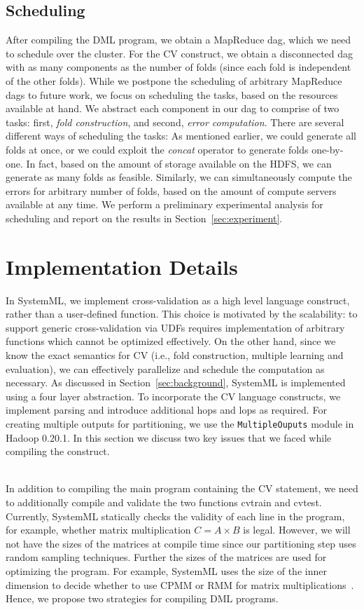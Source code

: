 \documentclass{vldb}
\newcommand{\topic}[1]{\par \smallskip \smallskip \noindent{\bf \uline{#1}}}
\begin{document}
\subsection{Scheduling}
After compiling the DML program, we obtain a MapReduce dag, which we need to
schedule over the cluster. For the CV construct, we obtain a disconnected dag
with as many components as the number of folds (since each fold is independent
of the other folds). While we postpone the scheduling of arbitrary MapReduce dags to
future work, we focus on scheduling the tasks, based on the resources available
at hand. We abstract each component in our dag to comprise of two
tasks: first, {\em fold construction}, and second, {\em error
computation}.  There are several different ways of scheduling the tasks: As mentioned
earlier, we could generate all folds at once, or we could exploit the {\em
concat} operator to generate folds one-by-one. In fact, based on the amount of
storage available on the HDFS, we can generate as many folds as feasible.
Similarly, we can simultaneously compute the errors for arbitrary number of
folds, based on the amount of compute servers available at any time. We perform
a preliminary experimental analysis for scheduling and report on the results in
Section~\ref{sec:experiment}.

\section{Implementation Details}
\label{sec:implementation}
In SystemML, we implement cross-validation as a high level language construct,
rather than a user-defined function. This choice is motivated by the
scalability: to support generic cross-validation via UDFs requires
implementation of arbitrary functions which cannot be optimized effectively. On
the other hand, since we know the exact semantics for CV (i.e., fold
construction, multiple learning and evaluation), we can effectively parallelize
and schedule the computation as necessary. As discussed in
Section~\ref{sec:background}, SystemML is implemented using a four layer
abstraction. To incorporate the CV language constructs, we implement parsing
and introduce additional hops and lops as required. For creating multiple
outputs for partitioning, we use the {\tt MultipleOuputs} module in Hadoop
0.20.1. In this section we discuss two key issues that we faced while compiling
the construct.

\topic{Compilation Issues}\\
In addition to compiling the main program containing the CV statement, we need to
additionally compile and validate the two functions cvtrain and cvtest.
Currently, SystemML statically checks the validity of each line in the program,
for example, whether matrix multiplication $C = A\times B$ is legal. However, we
will not have the sizes of the matrices at compile time since our
partitioning step uses random sampling techniques. Further the sizes of the
matrices are used for optimizing the program. For example, SystemML uses the
size of the inner dimension to decide whether to use CPMM or RMM for matrix
multiplications~\cite{DBLP:conf/icde/TianK11}. Hence, we propose two 
strategies for compiling DML programs.
\end{document}
